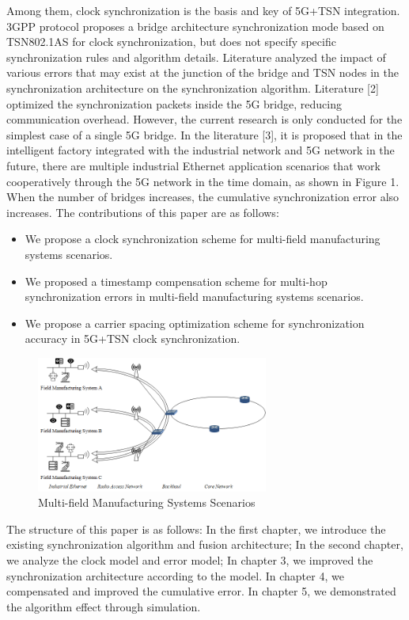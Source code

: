 \documentclass[english]{cccconf}
\begin{document}
Among them, clock synchronization is the basis and key of 5G+TSN integration. 3GPP protocol proposes a bridge architecture synchronization mode based on TSN802.1AS for clock synchronization, but does not specify specific synchronization rules and algorithm details. Literature \cite{9527833}analyzed the impact of various errors that may exist at the junction of the bridge and TSN nodes in the synchronization architecture on the synchronization algorithm. Literature [2] optimized the synchronization packets inside the 5G bridge, reducing communication overhead. However, the current research is only conducted for the simplest case of a single 5G bridge. In the literature [3], it is proposed that in the intelligent factory integrated with the industrial network and 5G network in the future, there are multiple industrial Ethernet application scenarios that work cooperatively through the 5G network in the time domain, as shown in Figure 1. When the number of bridges increases, the cumulative synchronization error also increases. The contributions of this paper are as follows:
\begin{itemize}
	\item We propose a clock synchronization scheme for multi-field manufacturing systems scenarios.
	\item We proposed a timestamp compensation scheme for multi-hop synchronization errors in multi-field manufacturing systems scenarios.
	\item We propose a carrier spacing optimization scheme for synchronization accuracy in 5G+TSN clock synchronization.
\end{itemize}
\begin{figure}[htbp]
	\centering
	\setcounter{figure}{0}
	\includegraphics[width=3in]{fig11.png}
	\caption{Multi-field Manufacturing Systems Scenarios}
\end{figure}
The structure of this paper is as follows: In the first chapter, we introduce the existing synchronization algorithm and fusion architecture; In the second chapter, we analyze the clock model and error model; In chapter 3, we improved the synchronization architecture according to the model. In chapter 4, we compensated and improved the cumulative error. In chapter 5, we demonstrated the algorithm effect through simulation.
\end{document}

